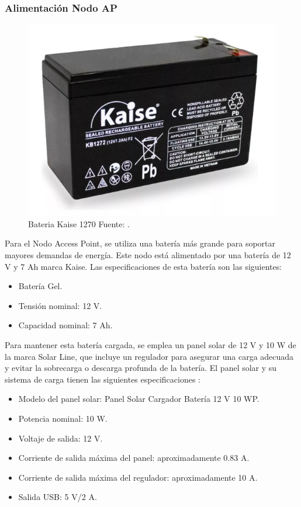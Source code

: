 \subsubsection{Alimentación Nodo AP}

\begin{figure}[H]
	\centering
	\includegraphics[scale=0.6]{./Figures/Hardware/Alimentacion/bateria.png}
	\caption{Bateria Kaise 1270 Fuente: \cite{kaise}.}
	\label{fig:bateria}
\end{figure}

\label{sec:AlimentacionNodoAP}

Para el Nodo Access Point, se utiliza una batería más grande para soportar mayores demandas de energía. Este nodo está alimentado por una batería de 12 V y 7 Ah marca Kaise. 
Las especificaciones de esta batería son las siguientes:

\begin{itemize}
    \item Batería Gel.
    \item Tensión nominal: 12 V.
    \item Capacidad nominal: 7 Ah.
\end{itemize}

Para mantener esta batería cargada, se emplea un panel solar de 12 V y 10 W de la marca Solar Line, que incluye un regulador  para asegurar una carga adecuada y evitar la sobrecarga o descarga profunda de la batería. El panel solar y su sistema de carga tienen las siguientes especificaciones \citep{SolarLine}:

\begin{itemize}
    \item Modelo del panel solar: Panel Solar Cargador Batería 12 V 10 WP.
    \item Potencia nominal: 10 W.
    \item Voltaje de salida: 12 V.
    \item Corriente de salida máxima del panel: aproximadamente 0.83 A.
    \item Corriente de salida máxima del regulador: aproximadamente 10 A.
    \item Salida USB: 5 V/2 A.
\end{itemize}


